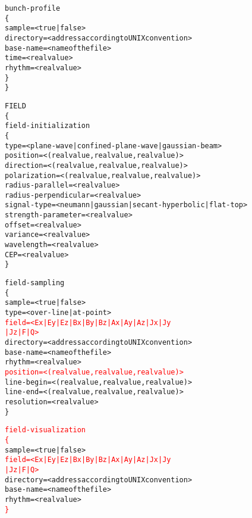 \documentclass[a4paper]{article}
\begin{document}
\begin{alltt}
\tabto{0.3cm}bunch-profile
\tabto{0.3cm}\{
\tabto{0.6cm}sample \tabto{6cm} = < true | false >
\tabto{0.6cm}directory \tabto{6cm} = < address according to UNIX convention >
\tabto{0.6cm}base-name \tabto{6cm} = < name of the file >
\tabto{0.6cm}time \tabto{6cm} = < real value >
\tabto{0.6cm}rhythm \tabto{6cm} = < real value >
\tabto{0.3cm}\}
\}

FIELD
\{
\tabto{0.3cm}field-initialization
\tabto{0.3cm}\{
\tabto{0.6cm}type \tabto{6cm} = < plane-wave | confined-plane-wave | gaussian-beam >
\tabto{0.6cm}position \tabto{6cm} = < ( real value , real value , real value ) >
\tabto{0.6cm}direction \tabto{6cm} = < ( real value , real value , real value ) >
\tabto{0.6cm}polarization \tabto{6cm} = < ( real value , real value , real value ) >
\tabto{0.6cm}radius-parallel \tabto{6cm} = < real value >
\tabto{0.6cm}radius-perpendicular \tabto{6cm} = < real value >
\tabto{0.6cm}signal-type \tabto{6cm} = < neumann | gaussian | secant-hyperbolic | flat-top >
\tabto{0.6cm}strength-parameter \tabto{6cm} = < real value >
\tabto{0.6cm}offset \tabto{6cm} = < real value >
\tabto{0.6cm}variance \tabto{6cm} = < real value >
\tabto{0.6cm}wavelength \tabto{6cm} = < real value >
\tabto{0.6cm}CEP \tabto{6cm} = < real value >
\tabto{0.3cm}\}

\tabto{0.3cm}field-sampling
\tabto{0.3cm}\{
\tabto{0.6cm}sample \tabto{6cm} = < true | false >
\tabto{0.6cm}type \tabto{6cm} = < over-line | at-point >
\tabto{0.6cm}\textcolor{red}{field \tabto{6cm} = < Ex | Ey | Ez | Bx | By | Bz | Ax | Ay | Az | Jx | Jy 
\tabto{6.3cm}| Jz | F | Q >}
\tabto{0.6cm}directory \tabto{6cm} = < address according to UNIX convention >
\tabto{0.6cm}base-name \tabto{6cm} = < name of the file >
\tabto{0.6cm}rhythm \tabto{6cm} = < real value >
\tabto{0.6cm}\textcolor{red}{position \tabto{6cm} = < ( real value , real value , real value ) >}
\tabto{0.6cm}line-begin \tabto{6cm} = < ( real value , real value , real value ) >
\tabto{0.6cm}line-end \tabto{6cm} = < ( real value , real value , real value ) >
\tabto{0.6cm}resolution \tabto{6cm} = < real value >
\tabto{0.3cm}\}

\tabto{0.3cm}\textcolor{red}{field-visualization}
\tabto{0.3cm}\textcolor{red}{\{}
\tabto{0.6cm}sample \tabto{6cm} = < true | false >
\tabto{0.6cm}\textcolor{red}{field \tabto{6cm} = < Ex | Ey | Ez | Bx | By | Bz | Ax | Ay | Az | Jx | Jy
\tabto{6.3cm}| Jz | F | Q >}
\tabto{0.6cm}directory \tabto{6cm} = < address according to UNIX convention >
\tabto{0.6cm}base-name \tabto{6cm} = < name of the file >
\tabto{0.6cm}rhythm \tabto{6cm} = < real value >
\tabto{0.3cm}\textcolor{red}{\}}


\end{alltt}
\end{document}
